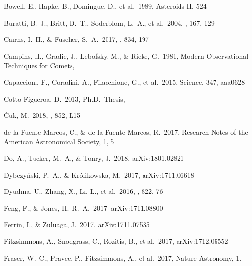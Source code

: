 \documentclass[a4paper,fleqn,usenatbib]{mnras}
\begin{document}
\begin{thebibliography}{99}

 Bowell, E., Hapke, B., Domingue, D., et al.\ 1989, Asteroids II, 524 

 Buratti, B.~J., Britt, D.~T., Soderblom, L.~A., et al.\ 2004, \icarus, 167, 129 

 Cairns, I.~H., \& Fuselier, S.~A.\ 2017, \apj, 834, 197

 Campins, H., Gradie, J., Lebofsky, M., \& Rieke, G.\ 1981, Modern Observational Techniques for Comets,

 Capaccioni, F., Coradini, A., Filacchione, G., et al.\ 2015, Science, 347, aaa0628 

 Cotto-Figueroa, D.\ 2013, Ph.D.~Thesis,  

 {\'C}uk, M.\ 2018, \apjl, 852, L15

 de la Fuente Marcos, C., \& de la Fuente Marcos, R.\ 2017, Research Notes of the American Astronomical Society, 1, 5

 Do, A., Tucker, M.~A., \& Tonry, J.\ 2018, arXiv:1801.02821

 Dybczy{\'n}ski, P.~A., \& Kr{\'o}likowska, M.\ 2017, arXiv:1711.06618

 Dyudina, U., Zhang, X., Li, L., et al.\ 2016, \apj, 822, 76 

 Feng, F., \& Jones, H.~R.~A.\ 2017, arXiv:1711.08800

 Ferrin, I., \& Zuluaga, J.\ 2017, arXiv:1711.07535

 Fitzsimmons, A., Snodgrass, C., Rozitis, B., et al.\ 2017, arXiv:1712.06552

 Fraser, W.~C., Pravec, P., Fitzsimmons, A., et al.\ 2017, Nature Astronomy, 1.


\end{thebibliography}
\end{document}
